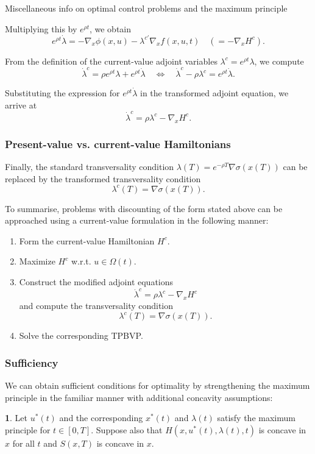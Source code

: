 \documentclass[10pt]{beamer}
\theoremstyle{definition}
\newtheorem{Fact}{\translate{Fact}}
\begin{document}
\begin{section}{Miscellaneous info on optimal control problems and the maximum principle}
\begin{frame}[fragile]
Multiplying this by $ e^{\rho t} $, we obtain \[  e^{\rho t} \dot{\lambda} =- \nabla_x \phi(x,u) - \lambda^{c \prime} \nabla_x f(x,u,t) \quad \left(=-\nabla_x H^c\right). \]

From the definition of the current-value adjoint variables $ \lambda^c = e^{\rho t} \lambda $, we compute \[ \dot{\lambda}^c = \rho e^{\rho t} \lambda + e^{\rho t} \dot{\lambda} \quad \Leftrightarrow \quad  \dot{\lambda}^c - \rho \lambda^c = e^{\rho t} \dot{\lambda}. \]

Substituting the expression for $ e^{\rho t} \dot{\lambda} $ in the transformed adjoint equation, we arrive at \[ \dot{\lambda}^c = \rho \lambda^c - \nabla_x H^c . \]
\end{frame}

\begin{frame}[fragile]
\frametitle{Present-value vs. current-value Hamiltonians}
Finally, the standard transversality condition $ \lambda(T) = e^{-\rho T} \nabla \sigma(x(T)) $ can be replaced by the transformed transversality condition 
\[ \lambda^c (T) = \nabla \sigma (x(T)) . \] \bigskip \pause

To summarise, problems with discounting of the form stated above can be approached using a current-value formulation in the following manner:
\begin{enumerate}
\item Form the current-value Hamiltonian $ H^c $.
\item Maximize $ H^c $ w.r.t. $ u\in \Omega(t) $.
\item Construct the modified adjoint equations 
\[ \dot{\lambda}^c = \rho \lambda^c - \nabla_x H^c \] and compute the transversality condition \[ \lambda^c (T) = \nabla\sigma (x(T)) . \]
\item Solve the corresponding TPBVP.
\end{enumerate}
\end{frame}

\begin{frame}[fragile]
\frametitle{Sufficiency}
We can obtain sufficient conditions for optimality by strengthening the maximum principle in the familiar manner with additional concavity assumptions:

\begin{Fact}
Let $ u^*(t) $ and the corresponding $ x^*(t) $ and $ \lambda(t) $ satisfy the maximum principle for $ t\in [0,T] $. Suppose also that $ H(x,u^*(t),\lambda (t),t) $ is concave in $ x $ for all $ t $ and $ S(x,T) $ is concave in $ x $. 


\end{Fact}
\end{frame}
\end{section}
\end{document}
